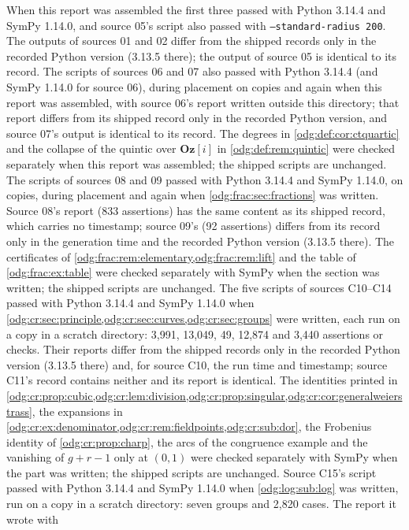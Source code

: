\documentclass[11pt,oneside]{article}
\numberwithin{equation}{section}
\theoremstyle{definition}
\theoremstyle{remark}
\newcommand{\Oz}{\mathbf{Oz}}
\newcommand{\Og}{\Oz[i]}
\begin{document}
When this report was assembled the first three passed with Python 3.14.4 and
SymPy 1.14.0, and source 05's script also passed with
\texttt{--standard-radius 200}. The outputs of sources 01 and 02 differ
from the shipped records only in the recorded Python version (3.13.5 there);
the output of source 05 is identical to its record. The scripts of sources 06
and 07 also passed with Python 3.14.4 (and SymPy 1.14.0 for source 06), during
placement on copies and again when this report was assembled, with source 06's
report written outside this directory; that report differs from its shipped
record only in the recorded Python version, and source 07's output is
identical to its record. The degrees in \cref{odg:def:cor:ctquartic} and the collapse of
the quintic over $\Og$ in \cref{odg:def:rem:quintic} were checked separately
when this report was assembled; the shipped scripts are unchanged.
The scripts of sources 08 and 09 passed with Python 3.14.4 and SymPy 1.14.0,
on copies, during placement and again when \cref{odg:frac:sec:fractions} was
written. Source 08's report (833 assertions) has the same content as its
shipped record, which carries no timestamp; source 09's (92 assertions)
differs from its record only in the generation time and the recorded Python
version (3.13.5 there). The certificates of
\cref{odg:frac:rem:elementary,odg:frac:rem:lift} and the table of
\cref{odg:frac:ex:table} were checked separately with SymPy when the section
was written; the shipped scripts are unchanged.
The five scripts of sources C10--C14 passed with Python 3.14.4 and SymPy 1.14.0 when
\cref{odg:cr:sec:principle,odg:cr:sec:curves,odg:cr:sec:groups} were written, each run
on a copy in a scratch directory: 3,991, 13,049, 49, 12,874 and 3,440 assertions or
checks. Their reports differ from the shipped records only in the recorded Python
version (3.13.5 there) and, for source C10, the run time and timestamp; source C11's
record contains neither and its report is identical. The identities printed in
\cref{odg:cr:prop:cubic,odg:cr:lem:division,odg:cr:prop:singular,odg:cr:cor:generalweierstrass},
the expansions in \cref{odg:cr:ex:denominator,odg:cr:rem:fieldpoints,odg:cr:sub:dor}, the
Frobenius identity of \cref{odg:cr:prop:charp}, the arcs of the congruence example and
the vanishing of $g+r-1$ only at $(0,1)$ were checked separately with SymPy when the part
was written; the shipped scripts are unchanged. Source C15's script passed with Python
3.14.4 and SymPy 1.14.0 when \cref{odg:log:sub:log} was written, run on a copy in a
scratch directory: seven groups and 2,820 cases. The report it wrote with
\end{document}
